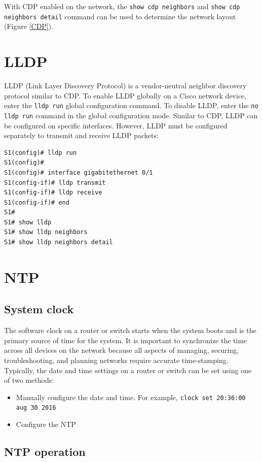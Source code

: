 With CDP enabled on the network, the \verb|show cdp neighbors| and \verb|show cdp neighbors detail| command can be used to determine the network layout (Figure \ref{CDP}).

\section{LLDP}

LLDP (Link Layer Discovery Protocol) is a vendor-neutral neighbor discovery protocol similar to CDP. To enable LLDP globally on a Cisco network device, enter the \verb|lldp run| global configuration command. To disable LLDP, enter the \verb|no lldp run| command in the global configuration mode. Similar to CDP, LLDP can be configured on specific interfaces. However, LLDP must be configured separately to transmit and receive LLDP packets:

\begin{verbatim}
S1(config)# lldp run
S1(config)#
S1(config)# interface gigabitethernet 0/1
S1(config-if)# lldp transmit
S1(config-if)# lldp receive
S1(config-if)# end
S1#
S1# show lldp
S1# show lldp neighbors
S1# show lldp neighbors detail 
\end{verbatim}

\section{NTP}

\subsection{System clock}

The software clock on a router or switch starts when the system boots and is the primary source of time for the system. It is important to synchronize the time across all devices on the network because all aspects of managing, securing, troubleshooting, and planning networks require accurate time-stamping. Typically, the date and time settings on a router or switch can be set using one of two methods: 

\begin{itemize}
\item Manually configure the date and time. For example, \verb|clock set 20:36:00 aug 30 2016|
\item Configure the NTP
\end{itemize}

\subsection{NTP operation}

